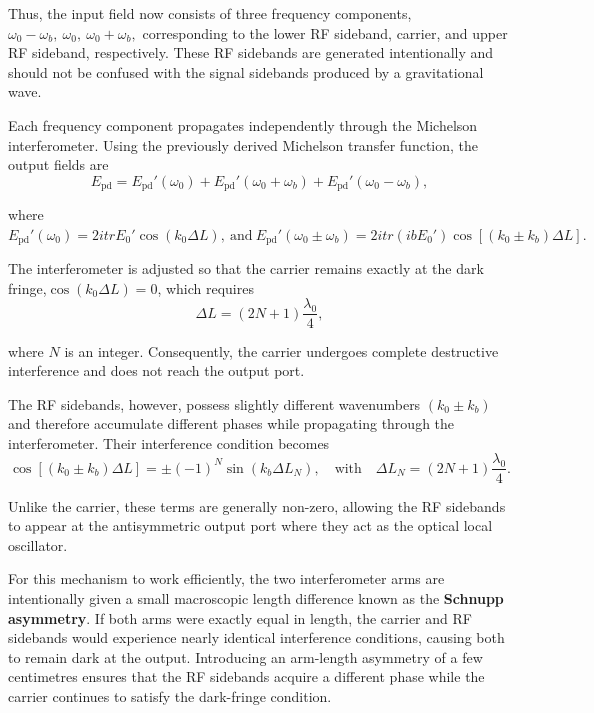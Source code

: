 \documentclass{report}
\begin{document}
Thus, the input field now consists of three frequency components,
$\omega_0-\omega_b, \
\omega_0, \
\omega_0+\omega_b,$
corresponding to the lower RF sideband, carrier, and upper RF sideband, respectively. These RF sidebands are generated intentionally and should not be confused with the signal sidebands produced by a gravitational wave.

Each frequency component propagates independently through the Michelson interferometer. Using the previously derived Michelson transfer function, the output fields are
\begin{equation}
    E_{\text{pd}}
=
E_{\text{pd}}'(\omega_0)
+
E_{\text{pd}}'(\omega_0+\omega_b)
+
E_{\text{pd}}'(\omega_0-\omega_b),
\end{equation}

where $E_{\text{pd}}'(\omega_0)
=
2itrE_0'
\cos(k_0\Delta L),
\
\text{and}
\
E_{\text{pd}}'(\omega_0\pm\omega_b)
=
2itr\left(ibE_0'\right)
\cos\!\left[(k_0\pm k_b)\Delta L\right].$


The interferometer is adjusted so that the carrier remains exactly at the dark fringe,$\cos(k_0\Delta L)=0$, which requires
\begin{equation}
    \Delta L
=
(2N+1)\frac{\lambda_0}{4},
\end{equation}

where $N$ is an integer. Consequently, the carrier undergoes complete destructive interference and does not reach the output port.

The RF sidebands, however, possess slightly different wavenumbers $(k_0\pm k_b)$ and therefore accumulate different phases while propagating through the interferometer. Their interference condition becomes
\begin{equation}
    \cos[(k_0\pm k_b)\Delta L]
=
\pm(-1)^N
\sin(k_b\Delta L_N),
\quad\text{with} 
\quad
\Delta L_N
=
(2N+1)\frac{\lambda_0}{4}.
\end{equation}

Unlike the carrier, these terms are generally non-zero, allowing the RF sidebands to appear at the antisymmetric output port where they act as the optical local oscillator.

For this mechanism to work efficiently, the two interferometer arms are intentionally given a small macroscopic length difference known as the \textbf{Schnupp asymmetry}. If both arms were exactly equal in length, the carrier and RF sidebands would experience nearly identical interference conditions, causing both to remain dark at the output. Introducing an arm-length asymmetry of a few centimetres ensures that the RF sidebands acquire a different phase while the carrier continues to satisfy the dark-fringe condition.
\end{document}
